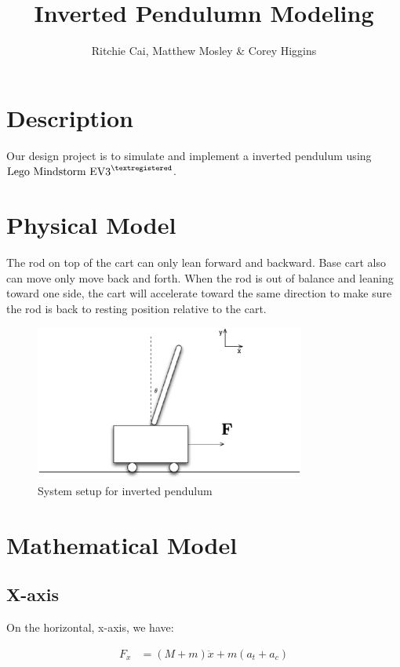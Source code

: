 \documentclass{notes}
\author{Ritchie Cai, Matthew Mosley \& Corey Higgins}
\title{Inverted Pendulumn Modeling}
\begin{document}
\maketitle 

\section{Description}
Our design project is to simulate and implement a inverted pendulum using 
$\text{Lego Mindstorm EV3}^{\textregistered}$. 

\section{Physical Model}

The rod on top of the cart can only lean forward and backward. 
Base cart also can move only move back and forth. 
When the rod is out of balance and leaning toward one side, the cart will accelerate toward the same
direction to make sure the rod is back to resting position relative to the cart.

\begin{figure}[!h]
  \begin{center}
    \includegraphics[width=3.5in]{pics/full_system.eps}
  \end{center}
  \caption{System setup for inverted pendulum}
  \label{fig:full_system}
\end{figure}


\section{Mathematical Model}



\subsection{X-axis}
On the horizontal, x-axis, we have:

\begin{align*}
  F_x & = (M+m) \ddot{x} + m (a_{t} + a_{c})
\end{align*}
\end{document}
